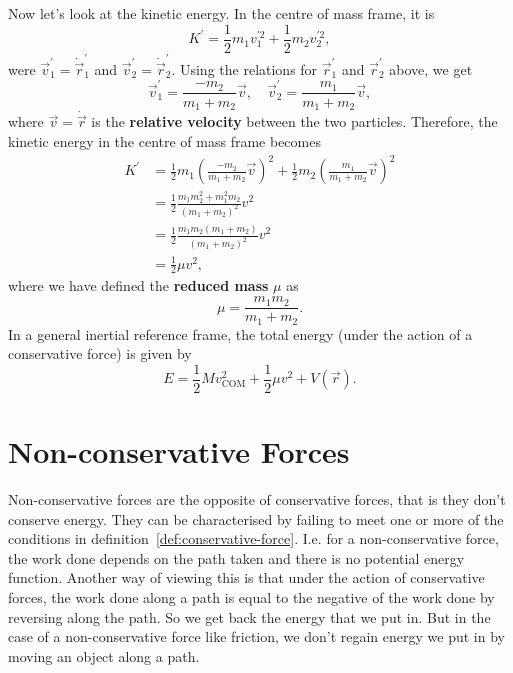 \documentclass[../classical_mechanics.tex]{subfiles}
\begin{document}
            Now let's look at the kinetic energy.
            In the centre of mass frame, it is
            \begin{equation}
                K^\prime=\frac{1}{2}m_1v_1^{\prime 2}+\frac{1}{2}m_2v_2^{\prime 2},
            \end{equation}
            were $\vec{v}_1^\prime=\dot{\vec{r}}_1^\prime$ and $\vec{v}_2^\prime=\dot{\vec{r}}_2^\prime$.
            Using the relations for $\vec{r}_1^\prime$ and $\vec{r}_2^\prime$ above, we get
            \begin{equation}
                \vec{v}_1^\prime=\frac{-m_2}{m_1+m_2}\vec{v},\quad\vec{v}_2^\prime=\frac{m_1}{m_1+m_2}\vec{v},
            \end{equation}
            where $\vec{v}=\dot{\vec{r}}$ is the \textbf{relative velocity} between the two particles.
            Therefore, the kinetic energy in the centre of mass frame becomes
            \begin{align}
                K^\prime&=\frac{1}{2}m_1\left(\frac{-m_2}{m_1+m_2}\vec{v}\right)^2+\frac{1}{2}m_2\left(\frac{m_1}{m_1+m_2}\vec{v}\right)^2\\
                &=\frac{1}{2}\frac{m_1m_2^2+m_1^2m_2}{(m_1+m_2)^2}v^2\\
                &=\frac{1}{2}\frac{m_1m_2(m_1+m_2)}{(m_1+m_2)^2}v^2\\
                &=\frac{1}{2}\mu v^2,
            \end{align}
            where we have defined the \textbf{reduced mass} $\mu$ as
            \begin{equation}
                \mu=\frac{m_1m_2}{m_1+m_2}.
            \end{equation}
            In a general inertial reference frame, the total energy (under the action of a conservative force) is given by
            \begin{equation}
                E=\frac{1}{2}Mv_\text{COM}^2+\frac{1}{2}\mu v^2+V(\vec{r}).
            \end{equation}

    \section{Non-conservative Forces}\label{sec:non-conservative-forces}
        Non-conservative forces are the opposite of conservative forces, that is they don't conserve energy.
        They can be characterised by failing to meet one or more of the conditions in definition~\ref{def:conservative-force}.
        I.e. for a non-conservative force, the work done depends on the path taken and there is no potential energy function.
        Another way of viewing this is that under the action of conservative forces, the work done along a path is equal to the negative of the work done by reversing along the path.
        So we get back the energy that we put in.
        But in the case of a non-conservative force like friction, we don't regain energy we put in by moving an object along a path.
\end{document}
